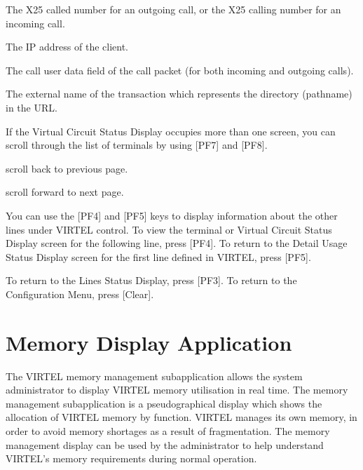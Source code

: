\documentclass[letterpaper,10pt,english]{sphinxmanual}
\begin{document}
\begin{description}
\sphinxAtStartPar
The X25 called number for an outgoing call, or the X25 calling number for an incoming call.

\sphinxAtStartPar
The IP address of the client.

\sphinxAtStartPar
The call user data field of the call packet (for both incoming and outgoing calls).

\sphinxAtStartPar
The external name of the transaction which represents the directory (pathname) in the URL.

\sphinxAtStartPar
If the Virtual Circuit Status Display occupies more than one screen, you can scroll through the list of terminals by using {[}PF7{]} and {[}PF8{]}.

\sphinxlineitem{{[}PF7{]}}
\sphinxAtStartPar
scroll back to previous page.

\sphinxlineitem{{[}PF8{]}}
\sphinxAtStartPar
scroll forward to next page.

\sphinxAtStartPar
You can use the {[}PF4{]} and {[}PF5{]} keys to display information about the other lines under VIRTEL control. To view the terminal or Virtual Circuit Status Display screen for the following line, press {[}PF4{]}. To return to the Detail Usage Status Display screen for the first line defined in VIRTEL, press {[}PF5{]}.

\sphinxAtStartPar
To return to the Lines Status Display, press {[}PF3{]}. To return to the Configuration Menu, press {[}Clear{]}.

\end{description}

\newpage

\ignorespaces 

\section{Memory Display Application}
\label{\detokenize{audit_operations_ and_performance:memory-display-application}}\label{\detokenize{audit_operations_ and_performance:index-40}}
\sphinxAtStartPar
The VIRTEL memory management sub\sphinxhyphen{}application allows the system  administrator to display VIRTEL memory utilisation in real time. The memory management sub\sphinxhyphen{}application is a pseudo\sphinxhyphen{}graphical display which shows the allocation of VIRTEL memory by function. VIRTEL manages its own memory, in order to avoid memory shortages as a result of fragmentation. The memory management display can be used by the administrator to help understand VIRTEL’s memory requirements during normal operation.
\end{document}

